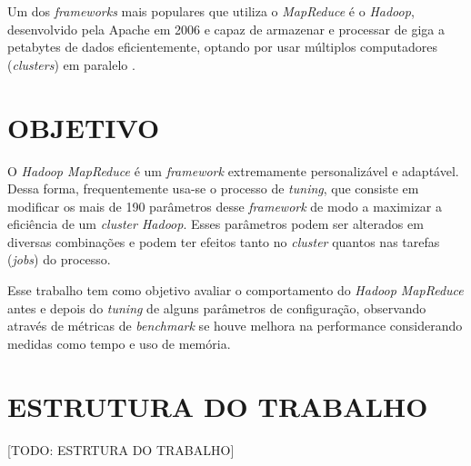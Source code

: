 Um dos \textit{frameworks} mais populares que utiliza o \textit{MapReduce} é o \textit{Hadoop}, desenvolvido pela Apache em 2006 e capaz de armazenar e processar de giga a petabytes de dados eficientemente, optando por usar múltiplos computadores (\textit{clusters}) em paralelo \cite{HadoopBook15}.

\section{OBJETIVO} \label{sec:objetivo}

O \textit{Hadoop MapReduce} é um \textit{framework} extremamente personalizável e adaptável. Dessa forma, frequentemente usa-se o processo de \textit{tuning}, que consiste em modificar os mais de 190 parâmetros desse \textit{framework} de modo a maximizar a eficiência de um \textit{cluster Hadoop}. Esses parâmetros podem ser alterados em diversas combinações e podem ter efeitos tanto no \textit{cluster} quantos nas tarefas (\textit{jobs}) do processo.

Esse trabalho tem como objetivo avaliar o comportamento do \textit{Hadoop MapReduce} antes e depois do \textit{tuning} de alguns parâmetros de configuração, observando através de métricas de \textit{benchmark} se houve melhora na performance considerando medidas como tempo e uso de memória.

\section{ESTRUTURA DO TRABALHO} \label{sec:estrtura}

[TODO: ESTRTURA DO TRABALHO]